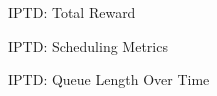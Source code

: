 \begin{frame}{IPTD: Total Reward}
  \centering
\end{frame}

\begin{frame}{IPTD: Scheduling Metrics}
  \centering
\end{frame}

\begin{frame}{IPTD: Queue Length Over Time}
  \centering
\end{frame}
